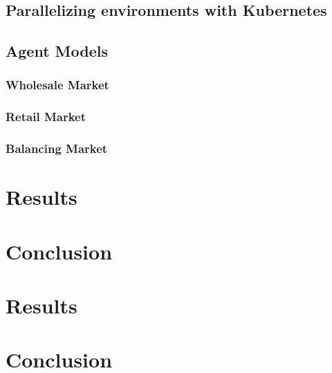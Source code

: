 \section{Parallelizing environments with Kubernetes}
\section{Agent Models}
\subsection{Wholesale Market}
\subsection{Retail Market}
\subsection{Balancing Market}

\chapter{Results}
\chapter{Conclusion}










\chapter{Results}

\chapter{Conclusion}
